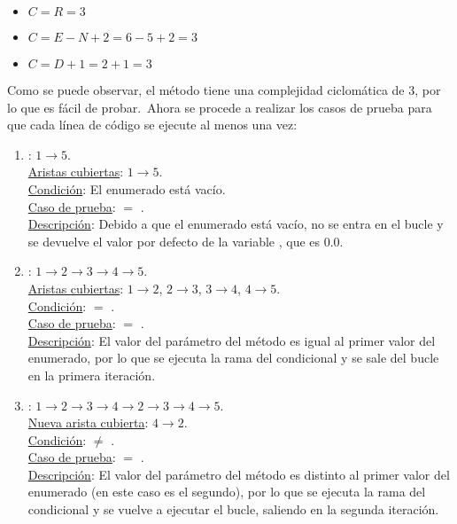 \begin{itemize}
	\item $C = R = 3$
	\item $C = E - N + 2 = 6 - 5 + 2 = 3$
	\item $C = D + 1 = 2 + 1 = 3$
\end{itemize}

Como se puede observar, el método tiene una complejidad ciclomática de 3, por lo que es fácil de probar.\ Ahora se
procede a realizar los casos de prueba para que cada línea de código se ejecute al menos una vez:

\begin{enumerate}
	\item {}: $1 \rightarrow 5$.
	\\
	\underline{Aristas cubiertas}: $1 \rightarrow 5$.\\
	\underline{Condición}: El enumerado  está vacío.\\
	\underline{Caso de prueba}:  $=$ .\\
	\underline{Descripción}:
	Debido a que el enumerado está vacío, no se entra en el bucle y se devuelve el valor por defecto de la variable
	, que es $0.0$.

	\item {}: $1 \rightarrow 2 \rightarrow 3 \rightarrow 4 \rightarrow 5$.
	\\
	\underline{Aristas cubiertas}: $1 \rightarrow 2$, $2 \rightarrow 3$, $3 \rightarrow 4$, $4 \rightarrow 5$.\\
	\underline{Condición}:  $=$ .\\
	\underline{Caso de prueba}:  $=$ .\\
	\underline{Descripción}:
	El valor del parámetro del método es igual al primer valor del enumerado,
	por lo que se ejecuta la rama  del condicional y se sale del bucle en la primera iteración.

	\item {}: $1 \rightarrow 2 \rightarrow 3 \rightarrow 4 \rightarrow 2 \rightarrow 3 \rightarrow 4 \rightarrow 5$.
	\\
	\underline{Nueva arista cubierta}: $4 \rightarrow 2$.\\
	\underline{Condición}:  $\neq$ .\\
	\underline{Caso de prueba}:  $=$ .\\
	\underline{Descripción}:
	El valor del parámetro del método es distinto al primer valor del
	enumerado (en este caso es el segundo), por lo que se ejecuta la rama  del condicional y se
	vuelve a ejecutar el bucle, saliendo en la segunda iteración.
\end{enumerate}
\label{itm:casos-prueba-pruebas-unitarias-caja-blanca}

